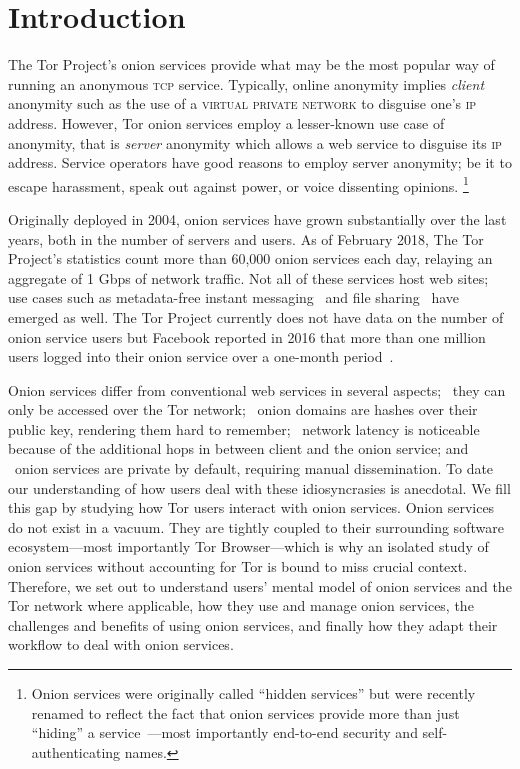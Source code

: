 \section{Introduction}
\label{sec:introduction}
The Tor Project's onion services provide what may be the
most popular way of running an anonymous \textsc{tcp} service. Typically, online anonymity implies \emph{client} anonymity
such as the use of a \textsc{virtual private network} to disguise one's \textsc{ip} address.  However, Tor onion services employ a lesser-known use case of anonymity, that is \emph{server} anonymity which allows a web service to
disguise its \textsc{ip} address.  Service operators have good reasons to employ
server anonymity; be it to escape harassment, speak out against power, or voice
dissenting opinions.  \footnote{Onion
services were originally called ``hidden services'' but were recently renamed to
reflect the fact that onion services provide more than just ``hiding'' a
service~\cite{Johnson2015a}---most importantly end-to-end security and
self-authenticating names.}

Originally deployed in 2004, onion services have grown substantially over the
last years, both in the number of servers and users.  As of February 2018, The
Tor Project's statistics count more than 60,000 onion services each day,
relaying an aggregate of 1 Gbps of network traffic.  Not all of these services
host web sites; use cases such as metadata-free instant
messaging~\cite{ricochet} and file sharing~\cite{onionshare} have emerged as
well.  The Tor Project currently does not have data on the number of onion
service users but Facebook reported in 2016 that more than one million users
logged into their onion service over a one-month period~\cite{facebook-users}.

Onion services differ from conventional web services in several aspects;
\first~they can only be accessed over the Tor network; \second~onion domains are
hashes over their public key, rendering them hard to remember; \third~network
latency is noticeable because of the additional hops in between client and the
onion service; and \fourth~onion services are private by default, requiring
manual dissemination.  To date our understanding of how users deal with these
idiosyncrasies is anecdotal.  We fill this gap by studying how Tor users
interact with onion services. Onion services do not exist in a vacuum.  They are tightly coupled to their
surrounding software ecosystem---most importantly Tor Browser---which is why an
isolated study of onion services without accounting for Tor is bound to miss crucial context.  Therefore, we set out to understand users'
mental model of onion services and the Tor network where applicable, how they use and manage onion services, the challenges and benefits of using onion services, and finally how they adapt their workflow to deal with onion services.

